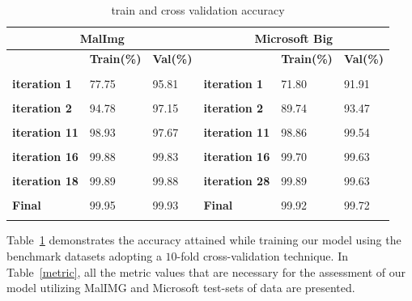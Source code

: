 \documentclass[pdflatex,sn-mathphys]{sn-jnl}%
\begin{document}
\begin{table}[tb]
     \centering
	\caption{train and cross validation accuracy}
	\begin{tabular}{|p{2cm}||p{1.5cm}||p{1.2cm}||p{2cm}||p{1.5cm}||p{1.2cm}|}
		\midrule
		\multicolumn{3}{c}{\textbf{MalImg}} & \multicolumn{3}{c}{\textbf{Microsoft Big}}\\
          \midrule
		\textbf{} & \textbf{Train(\%)} & \textbf{Val(\%)} & 
  \textbf{} & \textbf{Train(\%)} & \textbf{Val(\%)}\\\\
		\midrule
		\textbf{iteration 1}  &  77.75 & 95.81 & \textbf{iteration 1}  &  71.80 & 91.91\\\\ 
	
		\textbf{iteration 2} & 94.78 & 97.15 & \textbf{iteration 2} & 89.74 & 93.47\\\\
	
		\textbf{iteration 11} &  98.93 & 97.67 & \textbf{iteration 11} &  98.86 & 99.54 \\\\
		
	\textbf{iteration 16} &  99.88 & 99.83 & \textbf{iteration 16} &  99.70 & 99.63  \\\\
		
		\textbf{iteration 18}  & 99.89 & 99.88 & \textbf{iteration 28}  & 99.89 & 99.63 \\\\
		
		\textbf{Final} & 99.95 & 99.93 & \textbf{Final} & 99.92 & 99.72\\\\
  	\hline
	\end{tabular}
	\label{iteration}
\vspace{-2mm}
\end{table}

Table~\ref{iteration} demonstrates the accuracy attained while training our model using the benchmark datasets adopting a $10$-fold cross-validation technique. In Table~\ref{metric}, all the metric values that are necessary for the assessment of our model utilizing MalIMG and Microsoft test-sets of data are presented.
\end{document}
